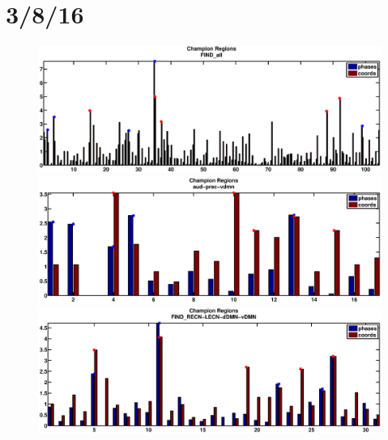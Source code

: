 \documentclass[11pt]{article}
\begin{document}
\section{3/8/16}
\begin{figure}
\label{fig:hist}
\includegraphics[trim= 150 0 130 0, clip, width = \textwidth]{pictures/hist_n5_FIND_all.eps}
\includegraphics[trim= 150 0 130 0, clip, width = \textwidth]{pictures/hist_n5_cyclicity_aud-prec-vdmn.eps}
\includegraphics[trim= 150 0 130 0, clip, width = \textwidth]{pictures/hist_n5_cyclicity_FIND_RECN-LECN-dDMN-vDMN.eps}
\caption{}
\end{figure}
\end{document}
